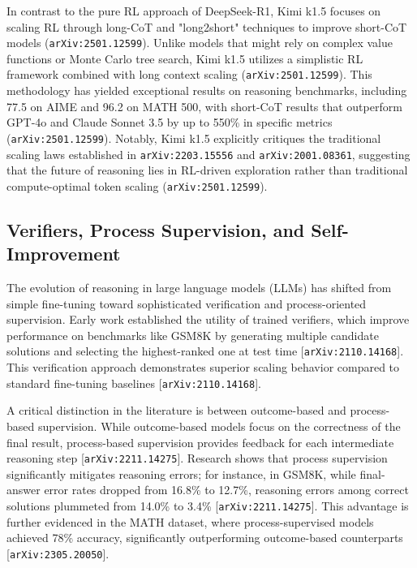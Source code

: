 \documentclass[11pt]{article}
\begin{document}
In contrast to the pure RL approach of DeepSeek-R1, Kimi k1.5 focuses on scaling RL through long-CoT and "long2short" techniques to improve short-CoT models (\texttt{arXiv:2501.12599}). Unlike models that might rely on complex value functions or Monte Carlo tree search, Kimi k1.5 utilizes a simplistic RL framework combined with long context scaling (\texttt{arXiv:2501.12599}). This methodology has yielded exceptional results on reasoning benchmarks, including 77.5 on AIME and 96.2 on MATH 500, with short-CoT results that outperform GPT-4o and Claude Sonnet 3.5 by up to 550\% in specific metrics (\texttt{arXiv:2501.12599}). Notably, Kimi k1.5 explicitly critiques the traditional scaling laws established in \texttt{arXiv:2203.15556} and \texttt{arXiv:2001.08361}, suggesting that the future of reasoning lies in RL-driven exploration rather than traditional compute-optimal token scaling (\texttt{arXiv:2501.12599}).

\subsection{Verifiers, Process Supervision, and Self-Improvement}

The evolution of reasoning in large language models (LLMs) has shifted from simple fine-tuning toward sophisticated verification and process-oriented supervision. Early work established the utility of trained verifiers, which improve performance on benchmarks like GSM8K by generating multiple candidate solutions and selecting the highest-ranked one at test time [\texttt{arXiv:2110.14168}]. This verification approach demonstrates superior scaling behavior compared to standard fine-tuning baselines [\texttt{arXiv:2110.14168}].

A critical distinction in the literature is between outcome-based and process-based supervision. While outcome-based models focus on the correctness of the final result, process-based supervision provides feedback for each intermediate reasoning step [\texttt{arXiv:2211.14275}]. Research shows that process supervision significantly mitigates reasoning errors; for instance, in GSM8K, while final-answer error rates dropped from 16.8\% to 12.7\%, reasoning errors among correct solutions plummeted from 14.0\% to 3.4\% [\texttt{arXiv:2211.14275}]. This advantage is further evidenced in the MATH dataset, where process-supervised models achieved 78\% accuracy, significantly outperforming outcome-based counterparts [\texttt{arXiv:2305.20050}].
\end{document}
